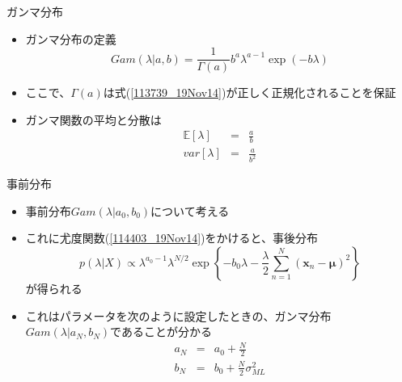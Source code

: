 \begin{frame}{ガンマ分布}
 \begin{itemize}
  \item ガンマ分布の定義
        \begin{equation}
         Gam(\lambda|a,b) = \frac{1}{\Gamma(a)}b^a\lambda^{a-1}\exp(-b\lambda)\label{113739_19Nov14}
        \end{equation}
  \item ここで、$\Gamma(a)$は式(\ref{113739_19Nov14})が正しく正規化されることを保証
  \item ガンマ関数の平均と分散は
        \begin{eqnarray}
         \mathbb{E}[\lambda] &=& \frac{a}{b}\\
         var[\lambda]& =& \frac{a}{b^2}
        \end{eqnarray}
 \end{itemize}
\end{frame}

\begin{frame}{事前分布}
 \begin{itemize}
  \item 事前分布$Gam(\lambda|a_0,b_0)$について考える
  \item これに尤度関数(\ref{114403_19Nov14})をかけると、事後分布
        \begin{equation}
         p(\lambda|X) \propto \lambda^{a_0-1}\lambda^{N/2}\exp\left\{-b_0\lambda-\frac{\lambda}{2}\sum_{n=1}^{N}(\bm{x}_n-\bm{\mu})^2\right\}\label{114734_19Nov14}
        \end{equation}
        が得られる
  \item これはパラメータを次のように設定したときの、ガンマ分布$Gam(\lambda|a_N,b_N)$であることが分かる
        \begin{eqnarray}
         a_N&=& a_0 + \frac{N}{2}\label{115004_19Nov14}\\
         b_N%
         &= & b_0+\frac{N}{2}\sigma^2_{ML}\label{115046_19Nov14}
        \end{eqnarray}
 \end{itemize}
\end{frame}

